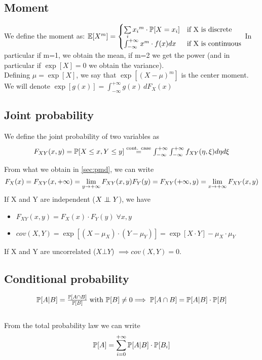 \subsection{Moment}
We define  the moment as:
$\mathbb{E}[X^m]=
\begin{cases}
    \sum\limits_{i} {x{_i}^{m} \cdot \mathbb{P}[X=x_i]} & \text{if X is discrete } \\
    \int_{-\infty}^{+\infty} {x^{m} \cdot f(x) dx }  & \text{if X is continuous}
\end{cases}$
In particular if m=1, we obtain the mean, if m=2 we get the power (and in particular if $\exp[X]=0$ we obtain the variance).\\
Defining $\mu = \exp[X]$, we say that $\exp[(X-\mu)^m]$ is the center moment.\\
We will denote $\exp[g(x)]=\int_{-\infty}^{+\infty} g(x)\, d F_X(x)$

\subsection{Joint probability}
We define the joint probability of two variables as
\begin{equation*}
  $$F_{XY}(x,y)=\prob[X\le x , Y \le y] \stackrel{\text{cont. case}}{=} \int_{-\infty}^{+\infty}\int_{-\infty}^{+\infty} f_{XY}(\eta,\xi) d\eta d\xi$$
\end{equation*}

From what we obtain in \ref{sec:pmd}, we can write \\
\begin{equation*}
  $$F_X(x)=F_{XY}(x,+\infty)=\lim\limits_{y \to +\infty} F_{XY}(x,y)$$
  $$F_Y(y)=F_{XY}(+\infty,y)=\lim\limits_{x \to +\infty} F_{XY}(x,y)$$
\end{equation*}
If X and Y are independent ($X \mathrel{\perp\mspace{-10mu}\perp} Y$), we have
\begin{itemize}
  \item $F_{XY}(x,y)=F_X(x)\cdot F_Y(y) \; \forall x,y$
  \item $cov(X,Y) = \exp[(X - \mu_X)\cdot (Y - \mu_Y)] = \exp[X \cdot Y]-\mu_X \cdot \mu_Y$
\end{itemize}
If X and Y are uncorrelated ($X \bot Y$) $\implies cov(X,Y)=0$.

\subsection{Conditional probability}
\begin{equation}
  $$\prob[A | B]= \frac{\prob[A \cap B]}{\prob[B]} \; \text{with $\prob[B]\ne 0$}$$ \\
  $$\implies \prob[A \cap B ] = \prob[A | B ]\cdot \prob[B]$$
\end{equation}\\
From the total probability law we can write\\
$$\mathbb{P}[A]= \sum\limits_{i=0}^{+\infty}\mathbb{P}[A|B]\cdot \mathbb{P}[B_i]$$

